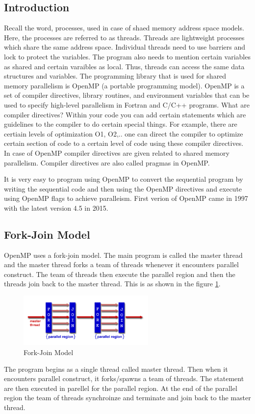 \documentclass[12pt]{article}
\begin{document}
\subsection{Introduction}
Recall the word, processes, used in case of shaed memory address space models. Here, the processes are referred to as threads.
Threads are lightweight processes which share the same address space. Individual threads need to use barriers and lock to protect the variables. 
The program also needs to mention certain variables as shared and certain varaibles as local. 
Thus, threads can access the same data structures and variables. The programming library that is used for shared memory parallelism is OpenMP (a portable programming model).
OpenMP is a set of compiler directives, library routines, and environment variables that can be used to specify high-level parallelism in Fortran and C/C++ programs.
What are compiler directives? Within your code you can add certain statements which are guidelines to the compiler to do certain special things.
For example, there are certiain levels of optimization O1, O2,.. one can direct the compiler to optimize certain section of code to a certain level of code using these compiler directives.
In case of OpenMP compiler directives are given related to shared memory parallelism. Compiler directives are also called pragmas in OpenMP.

It is very easy to program using OpenMP to convert the sequential program by writing the sequential code and then using the OpenMP directives and execute using OpenMP flags to achieve paralleism.
First verion of OpenMP came in 1997 with the latest version 4.5 in 2015.

\subsection{Fork-Join Model}
OpenMP uses a fork-join model. The main program is called the master thread and the master thread forks a team of threads whenever it encounters parallel construct. The team of threads then execute the parallel region and 
then the threads join back to the master thread.
This is as shown in the figure \ref{fig:forkjoin}.
\begin{figure}[H]
    \centering
    \includegraphics[width=0.6\textwidth]{images/forkjoin.png}
    \caption{Fork-Join Model}
    \label{fig:forkjoin}
\end{figure}
The program begins as a single thread called master thread. Then when it encounters parallel construct, it forks/spawns
a team of threads. The statement are then executed in parellel for the parallel region. At the end of the parallel region the team of threads synchroinze and terminate and join
back to the master thread.
\end{document}
